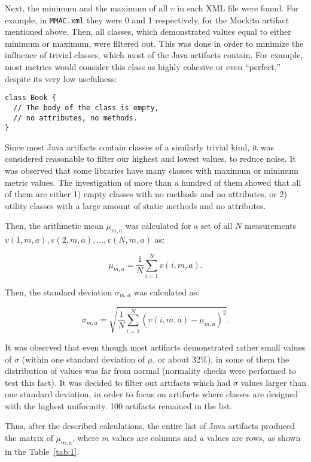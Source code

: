 \documentclass[conference]{IEEEtran}
\newcommand{\code}[1]{\texttt{#1}}
\begin{document}
Next, the minimum and the maximum of all $v$ in each XML file were found.
For example, in \code{MMAC.xml} they were 0 and 1 respectively, for the Mockito
artifact mentioned above. Then, all classes, which
demonstrated values equal to either minimum or maximum, were filtered out. This was done in order
to minimize the influence of trivial classes, which most of the Java artifacts
contain. For example, most metrics would consider this class as highly cohesive
or even ``perfect,'' despite its very low usefulness:

\begin{verbatim}
class Book {
  // The body of the class is empty,
  // no attributes, no methods.
}
\end{verbatim}

Since most Java artifacts contain classes of a similarly trivial kind, it was considered
reasonable to filter our highest and lowest values, to reduce noise.
It was
observed that some libraries have many classes with maximum or minimum metric
values. The investigation of more than a hundred of them showed that
all of them are either 1) empty classes with no methods and no attributes,
or 2) utility classes with a large amount of static methods and no attributes.

Then, the arithmetic mean $\mu_{m,a}$ was calculated for a set of all
$N$ measurements $v(1,m,a), v(2,m,a),\dots, v(N,m,a)$ as:

\begin{equation}
\mu_{m,a} = \frac{1}{N}\sum_{i=1}^N v(i,m,a).
\end{equation}

Then, the standard deviation $\sigma_{m,a}$ was calculated as:

\begin{equation}
\sigma_{m,a} = \sqrt{\frac{1}{N}\sum_{i=1}^N (v(i,m,a) - \mu_{m,a})^2}.
\end{equation}

It was observed that even though most artifacts demonstrated rather
small values of $\sigma$ (within one standard deviation of $\mu$,
or about 32\%), in some of them
the distribution of values was far from normal (normality checks were performed to test this fact).
It was decided to filter out artifacts which had $\sigma$ values larger than
one standard deviation, in order to focus on artifacts where classes
are designed with the highest uniformity.
100 artifacts remained in the list.

Thus, after the described calculations, the entire list of Java artifacts produced
the matrix of $\mu_{m,a}$, where $m$ values are columns and $a$
values are rows, as shown in the Table~\ref{tab:1}.
\end{document}

